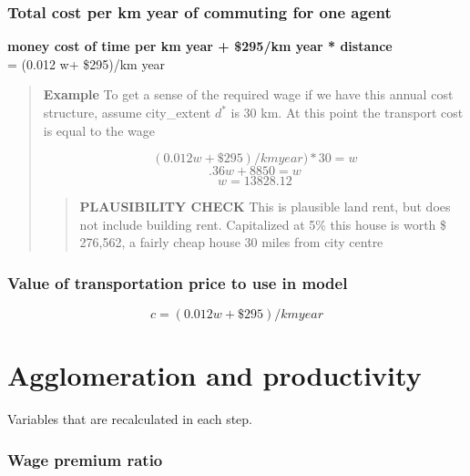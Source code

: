 \subsubsection{Total cost per km year of commuting for one agent}
\textbf{money cost of time per km year + \$295/km year * distance} \\
= (0.012 w+ \$295)/km year 
    \begin{quotation}
    \textbf{Example}
    To get a sense of the required wage if we have this annual cost structure, assume city\_extent $d^*$ is 30 km. At this point the transport cost is equal to the wage

\[(0.012 w+ \$295)/km year)*30 =  w\] 
\[.36w+ 8850=w\]
\[w=13828.12\]
\begin{quotation}
\textbf{PLAUSIBILITY CHECK}
This is plausible land rent, but does not include building rent. 
Capitalized at 5\% this house is worth \$ 276,562, a fairly cheap house 30 miles from city centre
\end{quotation}
\end{quotation}



\subsubsection{Value of transportation price to use in model}
\[ {c}=(0.012 w+ \$295)/km year \]



 
\section{Agglomeration and productivity}





Variables that are recalculated in each step.


\subsubsection{Wage premium ratio}

